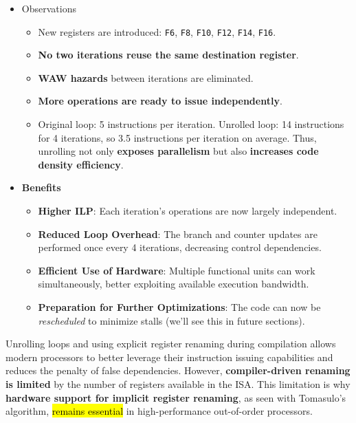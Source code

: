 \begin{itemize}
    \item Observations
    \begin{itemize}
        \item New registers are introduced: \texttt{F6}, \texttt{F8}, \texttt{F10}, \texttt{F12}, \texttt{F14}, \texttt{F16}.
        \item \textbf{No two iterations reuse the same destination register}.
        \item \textbf{WAW hazards} between iterations are eliminated.
        \item \textbf{More operations are ready to issue independently}.
        \item Original loop: 5 instructions per iteration. Unrolled loop: 14 instructions for 4 iterations, so 3.5 instructions per iteration on average. Thus, unrolling not only \textbf{exposes parallelism} but also \textbf{increases code density efficiency}.
    \end{itemize}
    \item[\textcolor{Green3}{\faIcon{check-circle}}] \textcolor{Green3}{\textbf{Benefits}}
    \begin{itemize}[label=\textcolor{Green3}{}]
        \item \textbf{Higher ILP}: Each iteration's operations are now largely independent.
        \item \textbf{Reduced Loop Overhead}: The branch and counter updates are performed once every 4 iterations, decreasing control dependencies.
        \item \textbf{Efficient Use of Hardware}: Multiple functional units can work simultaneously, better exploiting available execution bandwidth.
        \item \textbf{Preparation for Further Optimizations}: The code can now be \emph{rescheduled} to minimize stalls (we'll see this in future sections).
    \end{itemize}
\end{itemize}
Unrolling loops and using explicit register renaming during compilation allows modern processors to better leverage their instruction issuing capabilities and reduces the penalty of false dependencies. However, \textbf{compiler-driven renaming is limited} by the number of registers available in the ISA. This limitation is why \textbf{hardware support for implicit register renaming}, as seen with Tomasulo's algorithm, \hl{remains essential} in high-performance out-of-order processors.